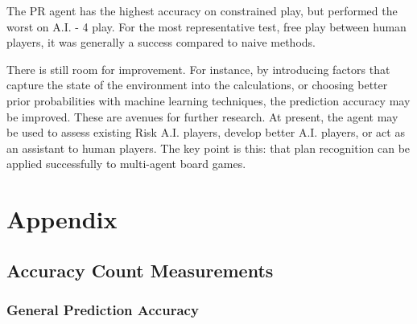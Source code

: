 \documentclass[parskip]{cs4rep}
\begin{document}
The PR agent has the highest accuracy on constrained play, but performed the worst on A.I. - 4 play. For the most representative test, free play between human players, it was generally a success compared to naive methods.

There is still room for improvement. For instance, by introducing factors that capture the state of the environment into the calculations, or choosing better prior probabilities with machine learning techniques, the prediction accuracy may be improved. These are avenues for further research. At present, the agent may be used to assess existing Risk A.I. players, develop better A.I. players, or act as an assistant to human players. The key point is this: that plan recognition can be applied successfully to multi-agent board games. 

\chapter{Appendix}

\section{Accuracy Count Measurements}

\subsection{General Prediction Accuracy}
\end{document}
